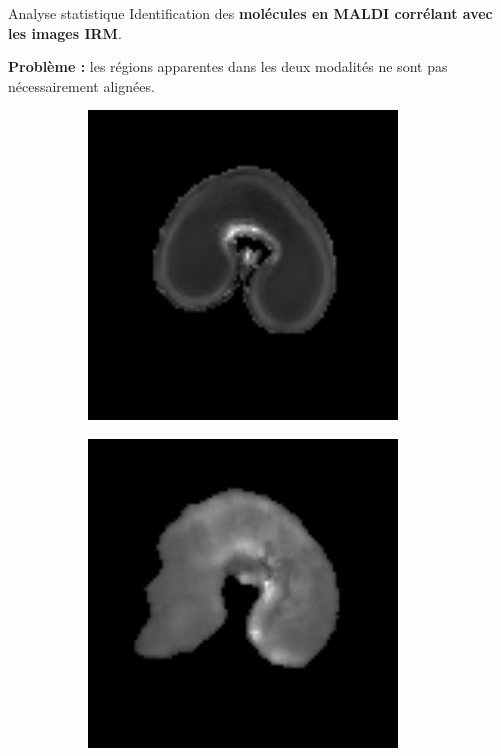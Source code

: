 \documentclass[10pt]{beamer}
\begin{document}
\begin{frame}{Analyse statistique}
  Identification des \textbf{molécules en MALDI corrélant avec les images IRM}.

  \textbf{Problème :} les régions apparentes dans les deux modalités ne sont pas nécessairement alignées.

  \begin{figure}[ht]
  \centering
  \begin{subfigure}[t]{0.33\textwidth}
    \centering
    \includegraphics[width=0.9\textwidth]{fig/t2_6_original}
    \caption{}
    \label{subfig:t2_6_original}
  \end{subfigure}%
  \begin{subfigure}[t]{0.33\textwidth}
    \centering
    \includegraphics[width=0.9\textwidth]{fig/msi_6_original}

\end{subfigure}
\end{figure}
\end{frame}
\end{document}
